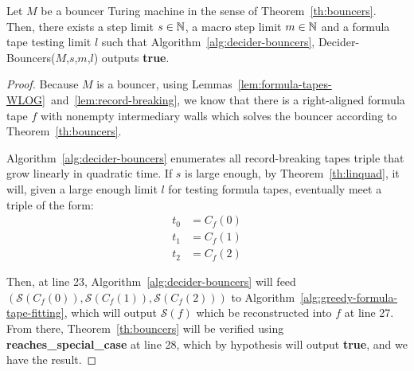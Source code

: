\begin{theorem}\label{th:bouncer-decider}
    Let $M$ be a bouncer Turing machine in the sense of Theorem~\ref{th:bouncers}. Then, there exists a step limit $s\in\mathbb{N}$, a macro step limit $m\in\mathbb{N}$ and a formula tape testing limit $l$ such that Algorithm~\ref{alg:decider-bouncers}, {\sc Decider-Bouncers}($M$,$s$,$m$,$l$) outputs \textbf{true}.
\end{theorem}
\begin{proof}
    Because $M$ is a bouncer, using Lemmas~\ref{lem:formula-tapes-WLOG}~and~\ref{lem:record-breaking}, we know that there is a right-aligned formula tape $f$ with nonempty intermediary walls which solves the bouncer according to Theorem~\ref{th:bouncers}.

    Algorithm~\ref{alg:decider-bouncers} enumerates all record-breaking tapes triple that grow linearly in quadratic time. If $s$ is large enough, by Theorem~\ref{th:linquad}, it will, given a large enough limit $l$ for testing formula tapes, eventually meet a triple of the form:
    \begin{align*}
        t_0 & = C_f(0) \\
        t_1 & = C_f(1) \\
        t_2 & = C_f(2)
    \end{align*}

    Then, at line 23, Algorithm~\ref{alg:decider-bouncers} will feed $(\mathcal{S}(C_f(0)),\mathcal{S}(C_f(1)),\mathcal{S}(C_f(2)))$ to Algorithm~\ref{alg:greedy-formula-tape-fitting}, which will output $\mathcal{S}(f)$ which be reconstructed into $f$ at line 27. From there, Theorem~\ref{th:bouncers} will be verified using \textbf{reaches\_special\_case} at line 28, which by hypothesis will output \textbf{true}, and we have the result.
\end{proof}

